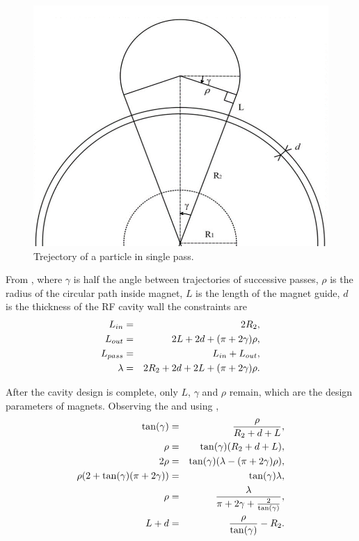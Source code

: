 \documentclass{article}
\begin{document}
\begin{figure}[H]    
    \centering
    \includegraphics[width=.7\linewidth]{../../../figures/design/magnet_design.png}
    \vspace{20pt}
    \caption{Trejectory of a particle in single pass.}
    \label{fig:magnet_design}
\end{figure}
\clearpage
From , where $\gamma$ is half the angle between trajectories of successive passes, $\rho$ is the radius of the circular path inside magnet, 
$L$ is the length of the magnet guide, $d$ is the thickness of the RF cavity wall the constraints are
\vspace{-10pt}\begin{eqnarray}
    L_{in} &=& 2R_2   , \\
    L_{out} &=& 2L + 2d + (\pi + 2\gamma)\rho  , \\
    L_{pass} &=& L_{in} + L_{out}  ,   \\
    \lambda &=& 2R_2 + 2d + 2L + (\pi + 2\gamma)\rho . \label{eq:magnet_lambda_constraint}
\vspace{-20pt}\end{eqnarray}

After the cavity design is complete, only $L$, $\gamma$ and $\rho$ remain, which are the design parameters of magnets.
Observing the  and using ,
\vspace{-10pt}\begin{eqnarray}
    \tan (\gamma) &=& \frac{\rho}{R_2 + d + L}  ,\\
    \rho &=&  \tan (\gamma) (R_2 + d + L)  , \\
    2\rho &=& \tan (\gamma) (\lambda - (\pi + 2\gamma)\rho)  , \\
    \rho (2 + \tan (\gamma)(\pi + 2\gamma)) &=&  \tan (\gamma) \lambda   ,\\
    \rho &=& \frac{\lambda}{\pi + 2\gamma + \frac{2}{\tan (\gamma)}}   ,\label{eq:magnet_rho_constraint} \\
    L + d &=& \frac{\rho}{\tan (\gamma)} - R_2 . \label{eq:magnet_L_constraint}
\vspace{-20pt}\end{eqnarray}
\end{document}

